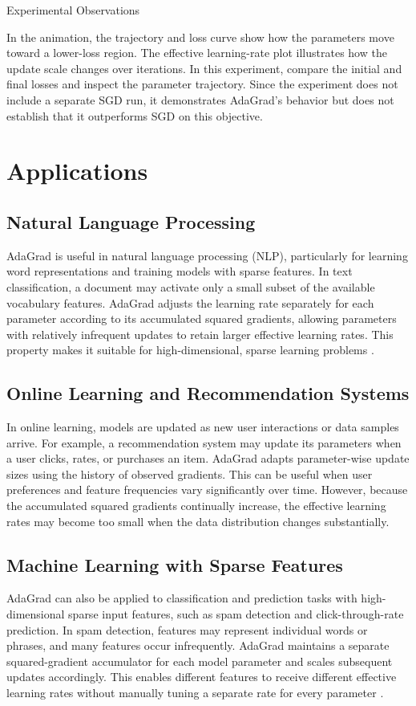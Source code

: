 \documentclass[11pt,a4paper]{article}
\begin{document}
Experimental Observations

In the animation, the trajectory and loss curve show how the
parameters move toward a lower-loss region. The effective
learning-rate plot illustrates how the update scale changes over
iterations. In this experiment, compare the initial and final
losses and inspect the parameter trajectory. Since the experiment
does not include a separate SGD run, it demonstrates AdaGrad's
behavior but does not establish that it outperforms SGD on this
objective.


\section{Applications}

\subsection{Natural Language Processing}
AdaGrad is useful in natural language processing (NLP), particularly
for learning word representations and training models with sparse
features. In text classification, a document may activate only a
small subset of the available vocabulary features. AdaGrad adjusts
the learning rate separately for each parameter according to its
accumulated squared gradients, allowing parameters with relatively
infrequent updates to retain larger effective learning rates.
This property makes it suitable for high-dimensional, sparse
learning problems \cite{duchi2011}.

\subsection{Online Learning and Recommendation Systems}
In online learning, models are updated as new user interactions
or data samples arrive. For example, a recommendation system may
update its parameters when a user clicks, rates, or purchases an
item. AdaGrad adapts parameter-wise update sizes using the history
of observed gradients. This can be useful when user preferences
and feature frequencies vary significantly over time. However,
because the accumulated squared gradients continually increase,
the effective learning rates may become too small when the data
distribution changes substantially.

\subsection{Machine Learning with Sparse Features}
AdaGrad can also be applied to classification and prediction tasks
with high-dimensional sparse input features, such as spam detection
and click-through-rate prediction. In spam detection, features may
represent individual words or phrases, and many features occur
infrequently. AdaGrad maintains a separate squared-gradient
accumulator for each model parameter and scales subsequent updates
accordingly. This enables different features to receive different
effective learning rates without manually tuning a separate rate
for every parameter \cite{duchi2011}.
\end{document}
